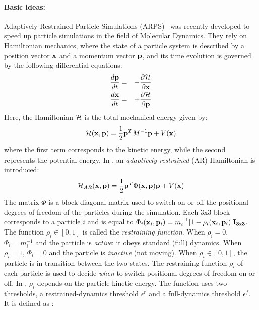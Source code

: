 \paragraph*{Basic ideas:}
Adaptively Restrained Particle Simulations (ARPS)~\cite{Artemova2012} was recently developed to speed up particle simulations in the field of Molecular Dynamics.
They rely on Hamiltonian mechanics, where the state of a particle system is described by a position vector $\mathbf{x}$ and a momentum vector $\mathbf{p}$, and its time evolution is governed by the following differential equations:
\begin{eqnarray*}
\frac{d\mathbf{p}}{dt} &=& -\frac{\partial \mathcal{H}}{\partial \mathbf{x}} \\
\frac{d\mathbf{x}}{dt} &=& +\frac{\partial \mathcal{H}}{\partial \mathbf{p}}
\end{eqnarray*}
Here, the Hamiltonian $\mathcal{H}$ is the total mechanical energy given by:
\begin{equation}
    \label{eq:hamiltonian}
    \mathcal{H}(\mathbf{x},\mathbf{p}) = \frac{1}{2} \mathbf{p}^{T}M^{-1}\mathbf{p} + V(\mathbf{x})
\end{equation}
where the first term corresponds to the kinetic energy, while the second represents the potential energy.
In \cite{Artemova2012}, an \textit{adaptively restrained} (AR) Hamiltonian is introduced:
\begin{equation}
    \label{eq:arhamiltonian}
    \mathcal{H}_{AR}(\mathbf{x}, \mathbf{p}) = \frac{1}{2} \mathbf{p}^{T}\Phi(\mathbf{x},\mathbf{p})\mathbf{p} + V(\mathbf{x})
\end{equation}
The matrix $\Phi$ is a block-diagonal matrix used to switch on or off the positional degrees of freedom of the particles during the simulation.
Each $3$x$3$ block corresponds to a particle $i$ and is equal to
$\Phi_{i}(\mathbf{x}_{i}, \mathbf{p}_{i}) = m_{i}^{-1}[1 - \rho_{i}(\mathbf{x}_{i}, \mathbf{p}_{i})]\mathbf{I_{3\mathtt{x}3}}$.
The function $\rho_{i} \in [0, 1]$ is called the \emph{restraining function}.
When $\rho_{i} = 0$, $\Phi_{i} = m_{i}^{-1}$ and the particle is \textit{active}: it obeys standard (full) dynamics.
When $\rho_{i} = 1$, $\Phi_{i} = 0$ and the particle is \textit{inactive} (not moving). When $\rho_{i} \in [0, 1]$, the particle is in transition between the two states.
The restraining function $\rho_{i}$ of each particle is used to decide \emph{when} to switch positional degrees of freedom on or off.
In \cite{Artemova2012}, $\rho_{i}$ depends on the particle kinetic energy.
The function uses two thresholds, a restrained-dynamics threshold $\epsilon^{r}$ and a full-dynamics threshold $\epsilon^{f}$.
It is defined as :
